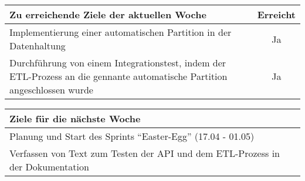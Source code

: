 \begin{tabularx}{\textwidth}{Xc}
    \arrayrulecolor{OliveGreen}
    \toprule
    {\bfseries Zu erreichende Ziele der aktuellen Woche} & {\bfseries Erreicht} \\
    \midrule[2pt]
    Implementierung einer automatischen Partition in der Datenhaltung  &  Ja  \\
    \rowcolor{OliveGreen!15}
    Durchführung von einem Integrationstest, indem der ETL-Prozess an die
    gennante automatische Partition angeschlossen wurde  &  Ja  \\
    \bottomrule[2pt]
\end{tabularx}
%
\vspace{1cm}
%
\begin{tabularx}{\textwidth}{Xc}
    \arrayrulecolor{OliveGreen}
    \toprule
    {\bfseries Ziele für die nächste Woche}              &                      \\
    \midrule[2pt]
    Planung und Start des Sprints ``Easter-Egg'' (17.04 - 01.05)  &  \\
    \rowcolor{OliveGreen!15}
    Verfassen von Text zum Testen der API und dem ETL-Prozess in der
    Dokumentation  &  \\
\end{tabularx}
